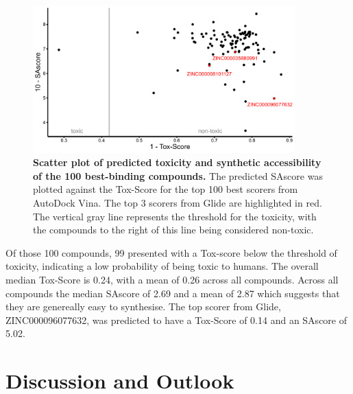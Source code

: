 \documentclass[11pt, letterpaper, titlepage]{article}
\begin{document}
\begin{figure}[h]
    \begin{center}
      \includegraphics[width=0.9\textwidth]{etoxpred_result.pdf}
    \end{center}
    \caption{\textbf{Scatter plot of predicted toxicity and synthetic accessibility of the 100 best-binding compounds.} The predicted \ac{SAscore} was plotted against the Tox-Score for the top 100 best scorers from AutoDock Vina. The top 3 scorers from Glide are highlighted in red. The vertical gray line represents the threshold for the toxicity, with the compounds to the right of this line being considered non-toxic.}\label{eToxPred}
  \end{figure}

Of those 100 compounds, 99 presented with a Tox-score below the threshold of toxicity, indicating a low probability of being toxic to humans. The overall median Tox-Score is 0.24, with a mean of 0.26 across all compounds. Across all compounds the median SAscore of 2.69 and a mean of 2.87 which suggests that they are genereally easy to synthesise. The top scorer from Glide, ZINC000096077632, was predicted to have a Tox-Score of 0.14 and an SAscore of 5.02.

\FloatBarrier

\section{Discussion and Outlook}
\end{document}
